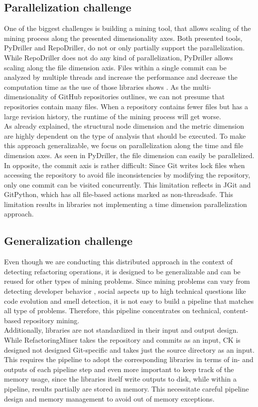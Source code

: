 \subsection{Parallelization challenge}
One of the biggest challenges is building a mining tool, that allows scaling of the mining process along the presented dimensionality axes. Both presented tools, PyDriller and RepoDriller, do not or only partially support the parallelization. While RepoDriller does not do any kind of parallelization, PyDriller allows scaling along the file dimension axis. Files within a single commit can be analyzed by multiple threads and increase the performance and decrease the computation time as the use of those libraries shows \cite{Gote2019}. As the multi-dimensionality of GitHub repositories outlines, we can not presume that repositories contain many files. When a repository contains fewer files but has a large revision history, the runtime of the mining process will get worse.\\
As already explained, the structural node dimension and the metric dimension are highly dependent on the type of analysis that should be executed. To make this approach generalizable, we focus on parallelization along the time and file dimension axes. As seen in PyDriller, the file dimension can easily be parallelized. In opposite, the commit axis is rather difficult: Since Git writes lock files when accessing the repository to avoid file inconsistencies by modifying the repository, only one commit can be visited concurrently. This limitation reflects in JGit and GitPython, which has all file-based actions marked as non-threadsafe. This limitation results in libraries not implementing a time dimension parallelization approach.

\subsection{Generalization challenge}
Even though we are conducting this distributed approach in the context of detecting refactoring operations, it is designed to be generalizable and can be reused for other types of mining problems. Since mining problems can vary from detecting developer behavior \cite{}, social aspects \cite{} up to high technical questions like code evolution \cite{} and smell detection\cite{}, it is not easy to build a pipeline that matches all type of problems. Therefore, this pipeline concentrates on technical, content-based repository mining.\\
Additionally, libraries are not standardized in their input and output design. While RefactoringMiner takes the repository and commits as an input, CK is designed not designed Git-specific and takes just the source directory as an input. This requires the pipeline to adopt the corresponding libraries in terms of in- and outputs of each pipeline step and even more important to keep track of the memory usage, since the libraries itself write outputs to disk, while within a pipeline, results partially are stored in memory. This necessitate careful pipeline design and memory management to avoid out of memory exceptions.